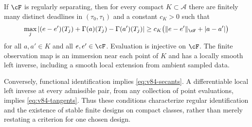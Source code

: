 \begin{theorem}
\label{thm:v84-design}
If $\cF$ is regularly separating, then for every compact
$K\subset\mathcal A$ there are finitely many distinct deadlines in
$(\tau_0,\tau_1)$ and a constant $c_K>0$ such that
\begin{equation}\label{eq:v84-design}
 \max_j |(e-e')(T_j)+\Gamma(a)(T_j)-\Gamma(a')(T_j)|
 \ge c_K\bigl(\|e-e'\|_{\cF}+|a-a'|\bigr)
\end{equation}
for all $a,a'\in K$ and all $e,e'\in\cF$. Evaluation is injective on
$\cF$. The finite observation map is an immersion near each point of
$K$ and has a locally smooth left inverse, including a smooth local
extension from ambient sampled data.

Conversely, functional identification implies
\eqref{eq:v84-secants}. A differentiable local left inverse at every
admissible pair, from any collection of point evaluations, implies
\eqref{eq:v84-tangents}. Thus these conditions characterize regular
identification and the existence of stable finite designs on compact
classes, rather than merely restating a criterion for one chosen design.
\end{theorem}
